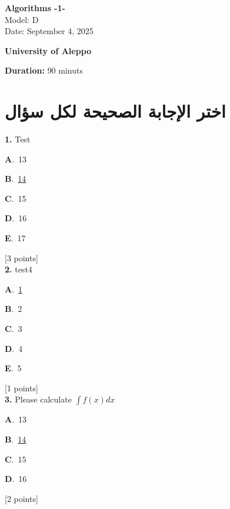 \documentclass[12pt]{article}
\newcommand{\choice}[3]{%
  \noindent\textbf{#1}.~#2\hfill#3\par\vspace{0.25em}
}
\begin{document}
\begin{flushright}
{\Large \textbf{{\textenglish{Algorithms -1-}}}}\\[0.25em]
{\normalsize \textenglish{Model: }{\textenglish{D}}}\\[0.1em]
{\normalsize \textenglish{Date: }{\textenglish{September 4, 2025}}}
\end{flushright}

\vspace{0.6cm}

\noindent
\begin{minipage}[t]{0.65\textwidth}
  \raggedright
  \textbf{{\textenglish{University of Aleppo}}}\\[0.3em]
\end{minipage}\hfill
\begin{minipage}[t]{0.3\textwidth}
  \raggedleft
  \textenglish{\textbf{Duration: }}{\textenglish{90 minuts}}
\end{minipage}

\vspace{0.9cm}

\section*{اختر الإجابة الصحيحة لكل سؤال}

\noindent \textbf{\textenglish{1.}} {\textenglish{Test}}

\noindent\choice{A}{{\textenglish{13}}}{}
\noindent\choice{B}{\underline{{\textenglish{14}}}}{}
\noindent\choice{C}{{\textenglish{15}}}{}
\noindent\choice{D}{{\textenglish{16}}}{}
\noindent\choice{E}{{\textenglish{17}}}{}
\hfill {\textenglish{[3 points]}}\\[0.5em]

\noindent \textbf{\textenglish{2.}} {\textenglish{test4}}

\noindent\choice{A}{\underline{{\textenglish{1}}}}{}
\noindent\choice{B}{{\textenglish{2}}}{}
\noindent\choice{C}{{\textenglish{3}}}{}
\noindent\choice{D}{{\textenglish{4}}}{}
\noindent\choice{E}{{\textenglish{5}}}{}
\hfill {\textenglish{[1 points]}}\\[0.5em]

\noindent \textbf{\textenglish{3.}} {\textenglish{Please calculate }}\(\int f(x)dx\)

\noindent\choice{A}{{\textenglish{13}}}{}
\noindent\choice{B}{\underline{{\textenglish{14}}}}{}
\noindent\choice{C}{{\textenglish{15}}}{}
\noindent\choice{D}{{\textenglish{16}}}{}
\hfill {\textenglish{[2 points]}}\\[0.5em]
\end{document}
